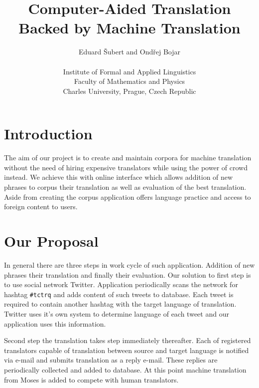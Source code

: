\setlength{\topmargin}{-.5in}
\setlength{\textheight}{9in}
\setlength{\oddsidemargin}{.125in}
\setlength{\textwidth}{6.25in}

\title{\textbf{Computer-Aided Translation Backed by Machine Translation}}
\author{Eduard \v{S}ubert and Ond\v{r}ej Bojar\\\\
Institute of Formal and Applied Linguistics\\
Faculty of Mathematics and Physics\\
Charles University, Prague, Czech Republic}

\renewcommand{\today}{June 20, 2014}
\maketitle

\def\footurl#1{\footnote{\tt{} #1}}
\def\equo#1{``#1''}

\def\hashtag#1{\texttt{\##1}}

\section{Introduction}

The aim of our project is to create and maintain corpora for machine translation
without the need of hiring expensive translators while using the power of crowd
instead. We achieve this with online interface which allows addition of new
phrases to corpus their translation as well as evaluation of the best
translation. Aside from creating the corpus application offers language practice
and access to foreign content to users.

\section{Our Proposal}

In general there are three steps in work cycle of such application. Addition of
new phrases their translation and finally their evaluation. Our solution to
first step is to use social network Twitter. Application periodically scans the
network for hashtag \hashtag{tctrq} and adds content of such tweets to database.
Each tweet is required to contain another hashtag with the target language of
translation. Twitter uses it's own system to determine language of each tweet
and our application uses this information. 

Second step the translation takes step immediately thereafter. Each of
registered translators capable of translation between source and target language
is notified via e-mail and submits translation as a reply e-mail. These replies
are periodically collected and added to database. At this point machine
translation from Moses is added to compete with human translators. 

